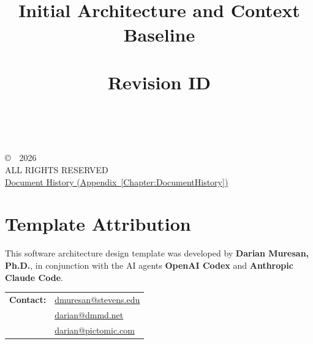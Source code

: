 \title{\ProjectName\\[0.5em]\large Initial Architecture and Context Baseline\\[1.5em]\normalsize\VERSION\\Revision ID \texttt{\DocumentRevisionID}\\\DocumentStatus}
\author{\DocumentOwner\\\Organization}
\conferraldate{}{\DocumentDate}
\copyrightholder{\Organization}
\maketitle

\begin{copyrightpage}
\copyright\ \Organization\ 2026 \\
ALL RIGHTS RESERVED \\[0.2in]
\hyperref[Chapter:DocumentHistory]{Document History (Appendix~\ref*{Chapter:DocumentHistory})}
\end{copyrightpage}

\cleardoublepage
{}
\chapter*{Template Attribution}

This software architecture design template was developed by
\textbf{Darian Muresan, Ph.D.}, in conjunction with the AI agents
\textbf{OpenAI Codex} and \textbf{Anthropic Claude Code}.

\begin{tabularx}{\linewidth}{@{}L{3.0cm}Y@{}}
\textbf{Contact:} & \href{mailto:dmuresan@stevens.edu}{dmuresan@stevens.edu}\\
& \href{mailto:darian@dmmd.net}{darian@dmmd.net}\\
& \href{mailto:darian@pictomic.com}{darian@pictomic.com}
\end{tabularx}

\clearpage
\begin{abstract}
  
\end{abstract}

\contentspage
\tablelistpage
\figurelistpage
